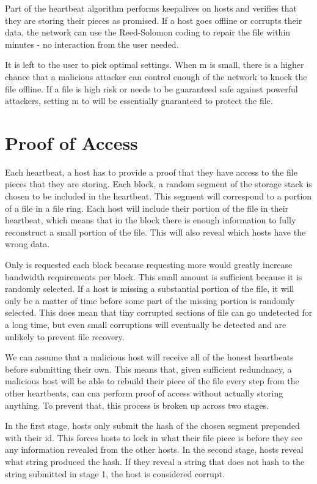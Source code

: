 \documentclass[twocolumn]{article}
\begin{document}
Part of the heartbeat algorithm performs keepalives on hosts and verifies that they are storing their pieces as promised.
If a host goes offline or corrupts their data, the network can use the Reed-Solomon coding to repair the file within minutes - no interaction from the user needed.

It is left to the user to pick optimal settings.
When m is small, there is a higher chance that a malicious attacker can control enough of the network to knock the file offline.
If a file is high risk or needs to be guaranteed safe against powerful attackers, setting m to \minuncorruptedhosts \space will be essentially guaranteed to protect the file.

\section{Proof of Access}

Each heartbeat, a host has to provide a proof that they have access to the file pieces that they are storing.
Each block, a random \filechecksize \space segment of the storage stack is chosen to be included in the heartbeat.
This segment will correspond to a portion of a file in a file ring.
Each host will include their portion of the file in their heartbeat, which means that in the block there is enough information to fully reconstruct a small portion of the file.
This will also reveal which hosts have the wrong data.

Only \filechecksize \space is requested each block because requesting more would greatly increase bandwidth requirements per block.
This small amount is sufficient because it is randomly selected.
If a host is missing a substantial portion of the file, it will only be a matter of time before some part of the missing portion is randomly selected.
This does mean that tiny corrupted sections of file can go undetected for a long time, but even small corruptions will eventually be detected and are unlikely to prevent file recovery.

We can assume that a malicious host will receive all of the honest heartbeats before submitting their own.
This means that, given sufficient redundnacy, a malicious host will be able to rebuild their piece of the file every step from the other heartbeats, can cna perform proof of access without actually storing anything.
To prevent that, this process is broken up across two stages.

In the first stage, hosts only submit the hash of the chosen segment prepended with their id.
This forces hosts to lock in what their file piece is before they see any information revealed from the other hosts.
In the second stage, hosts reveal what string produced the hash.
If they reveal a string that does not hash to the string submitted in stage 1, the host is considered corrupt.
\end{document}
